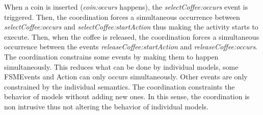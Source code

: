 When a coin is inserted (\emph{coin:occurs} happens), the \emph{selectCoffee:occurs} event is triggered. Then, the coordination forces a simultaneous occurrence between \emph{selectCoffee:occurs} and \emph{selectCoffee:startAction} thus making the activity starts to execute. Then, when the coffee is released, the coordination forces a simultaneous occurrence between the events \emph{releaseCoffee:startAction} and \emph{releaseCoffee:occurs}. The coordination constrains some events by making them to happen simultaneously. This reduces what can be done by individual models, \ie some FSMEvents and Action can only occurs simultaneously. Other events are only constrained by the individual semantics. The coordination constraints the behavior of models without adding new ones. In this sense, the coordination is non intrusive thus not altering the behavior of individual models. 

